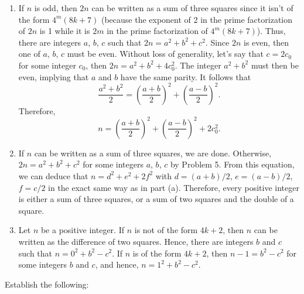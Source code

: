 \begin{solution}
    \begin{enumerate}
        \item If $n$ is odd, then $2n$ can be written as a sum of three squares since it isn't of the form $4^m(8k+7)$ (because the exponent of 2 in the prime factorization of $2n$ is 1 while it is $2m$ in the prime factorization of $4^m(8k+7)$). Thus, there are integers $a$, $b$, $c$ such that $2n = a^2 + b^2 + c^2$. Since $2n$ is even, then one of $a$, $b$, $c$ must be even. Without loss of generality, let's say that $c = 2c_0$ for some integer $c_0$, then $2n = a^2 + b^2 + 4c_0^2$. The integer $a^2 + b^2$ must then be even, implying that $a$ and $b$ have the same parity. It follows that
        $$\frac{a^2 + b^2}{2} = \left(\frac{a + b}{2}\right)^2 + \left(\frac{a - b}{2}\right)^2.$$
        Therefore,
        $$n = \left(\frac{a + b}{2}\right)^2 + \left(\frac{a - b}{2}\right)^2 + 2c_0^2.$$
        \item If $n$ can be written as a sum of three squares, we are done. Otherwise, $2n = a^2 + b^2 + c^2$ for some integers $a$, $b$, $c$ by Problem 5. From this equation, we can deduce that $n = d^2 + e^2 + 2f^2$ with $d = (a+b)/2$, $e = (a-b)/2$, $f = c/2$ in the exact same way as in part (a). Therefore, every positive integer is either a sum of three squares, or a sum of two squares and the double of a square.
        \item Let $n$ be a positive integer. If $n$ is not of the form $4k + 2$, then $n$ can be written as the difference of two squares. Hence, there are integers $b$ and $c$ such that $n = 0^2 + b^2 - c^2$. If $n$ is of the form $4k + 2$, then $n - 1 = b^2 - c^2$ for some integers $b$ and $c$, and hence, $n = 1^2 + b^2 - c^2$. \\
    \end{enumerate}
\end{solution}

\begin{exercise}
    Establish the following:
\end{exercise}

